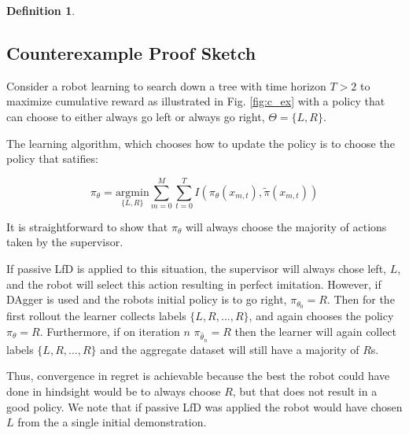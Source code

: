 \documentclass[10pt, conference]{ieeeconf}      %
\newtheorem{defn}{Definition}[section]
\begin{document}
\appendix


\begin{defn}

\end{defn}

\subsection{Counterexample Proof Sketch}
Consider a robot learning to search down a tree with time horizon $T > 2$ to maximize cumulative reward as illustrated in Fig. \ref{fig:c_ex} with a policy that can choose to either always go left or always go right, $\Theta = \lbrace L,R \rbrace$.

The learning algorithm, which chooses how to update the policy is to choose the policy that satifies: 

$$\pi_{\theta} = \underset{\lbrace L,R \rbrace}{\mbox{argmin}} \sum^M_{m=0}\sum^T_{t=0} I(\pi_\theta(x_{m,t}),\tilde{\pi}(x_{m,t}))$$

It is straightforward to show that $\pi_{\theta}$ will always choose the majority of actions taken by the supervisor.

If passive LfD is applied to this situation, the supervisor will always chose left, $L$, and the robot will select this action resulting in perfect imitation. However, if DAgger is used and the robots initial policy is to go right, $\pi_{\theta_0} = R$.
Then for the first rollout the learner collects labels $\{L, R, ..., R\}$, and again chooses the policy $\pi_{\theta} = R$.
Furthermore, if on iteration $n$ $\pi_{\hat{\theta}_n} = R$ then the learner will again collect labels $\{L, R, ..., R\}$ and the aggregate dataset will still have a majority of $R$s.

Thus, convergence in regret is achievable because the best the robot could have done in hindsight would be to always choose $R$, but that does not result in a good policy. We note that if passive LfD was applied the robot would have chosen $L$ from the a single initial demonstration. 
\end{document}
